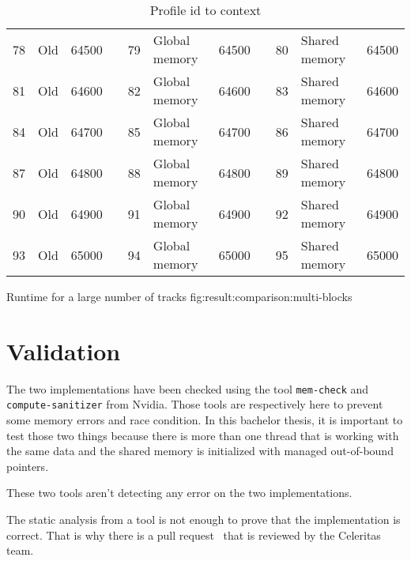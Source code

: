 \begin{table}[ht]
{\begin{tabular}{|l|l|l|l|l|l|l|l|l|l|l|}
        78  & Old            & 64500    & & 79  & Global memory & 64500   & & 80    & Shared memory & 64500 \\ \cline{1-3} \cline{5-7} \cline{9-11}
        81  & Old            & 64600    & & 82  & Global memory & 64600   & & 83    & Shared memory & 64600 \\ \cline{1-3} \cline{5-7} \cline{9-11}
        84  & Old            & 64700    & & 85  & Global memory & 64700   & & 86    & Shared memory & 64700 \\ \cline{1-3} \cline{5-7} \cline{9-11}
        87  & Old            & 64800    & & 88  & Global memory & 64800   & & 89    & Shared memory & 64800 \\ \cline{1-3} \cline{5-7} \cline{9-11}
        90  & Old            & 64900    & & 91  & Global memory & 64900   & & 92    & Shared memory & 64900 \\ \cline{1-3} \cline{5-7} \cline{9-11}
        93  & Old            & 65000    & & 94  & Global memory & 65000   & & 95    & Shared memory & 65000 \\ \cline{1-3} \cline{5-7} \cline{9-11}
    \end{tabular}
    }
    \caption{Profile id to context}
    \label{tab:result:comparison:profile}
\end{table}

{Runtime for a large number of tracks}
{fig:result:comparison:multi-blocks}

\section{Validation}
\label{ch:result:validation}

The two implementations have been checked using the tool \texttt{mem-check} and
\texttt{compute-sanitizer} from Nvidia.
Those tools are respectively here to prevent some memory errors and race
condition.
In this bachelor thesis, it is important to test those two things because there
is more than one thread that is working with the same data and the shared memory
is initialized with managed out-of-bound pointers.

These two tools aren't detecting any error on the two implementations.

The static analysis from a tool is not enough to prove that the implementation is
correct.
That is why there is a pull request~\cite{pull-request-barras} that is reviewed
by the Celeritas team.